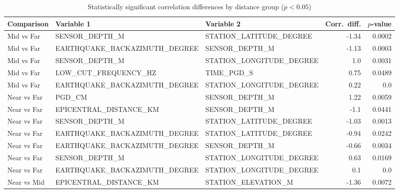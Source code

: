 \begin{table}[H]
\centering
\caption{Statistically significant correlation differences by distance group ($p < 0.05$)}
\label{tab:corr_diff}
\begin{tabular}{lllrr}
\toprule
Comparison & Variable 1 & Variable 2 & Corr.\ diff. & $p$-value \\
\midrule
Mid vs Far & SENSOR_DEPTH_M & STATION_LATITUDE_DEGREE & -1.34 & 0.0002 \\
Mid vs Far & EARTHQUAKE_BACKAZIMUTH_DEGREE & SENSOR_DEPTH_M & -1.13 & 0.0003 \\
Mid vs Far & SENSOR_DEPTH_M & STATION_LONGITUDE_DEGREE & 1.0 & 0.0031 \\
Mid vs Far & LOW_CUT_FREQUENCY_HZ & TIME_PGD_S & 0.75 & 0.0489 \\
Mid vs Far & EARTHQUAKE_BACKAZIMUTH_DEGREE & STATION_LONGITUDE_DEGREE & 0.22 & 0.0 \\
Near vs Far & PGD_CM & SENSOR_DEPTH_M & 1.22 & 0.0059 \\
Near vs Far & EPICENTRAL_DISTANCE_KM & SENSOR_DEPTH_M & -1.1 & 0.0441 \\
Near vs Far & SENSOR_DEPTH_M & STATION_LATITUDE_DEGREE & -1.03 & 0.0013 \\
Near vs Far & EARTHQUAKE_BACKAZIMUTH_DEGREE & STATION_LATITUDE_DEGREE & -0.94 & 0.0242 \\
Near vs Far & EARTHQUAKE_BACKAZIMUTH_DEGREE & SENSOR_DEPTH_M & -0.66 & 0.0034 \\
Near vs Far & SENSOR_DEPTH_M & STATION_LONGITUDE_DEGREE & 0.63 & 0.0169 \\
Near vs Far & EARTHQUAKE_BACKAZIMUTH_DEGREE & STATION_LONGITUDE_DEGREE & 0.1 & 0.0 \\
Near vs Mid & EPICENTRAL_DISTANCE_KM & STATION_ELEVATION_M & -1.36 & 0.0072 \\
\bottomrule
\end{tabular}
\end{table}